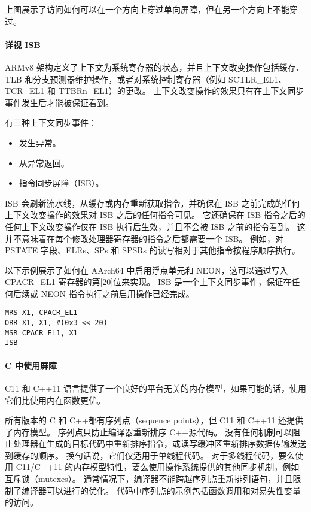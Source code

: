 
上图展示了访问如何可以在一个方向上穿过单向屏障，但在另一个方向上不能穿过。

\paragraph{详视 ISB}

ARMv8 架构定义了上下文为系统寄存器的状态，并且上下文改变操作包括缓存、TLB 和分支预测器维护操作，或者对系统控制寄存器（例如 SCTLR\_EL1、TCR\_EL1 和 TTBRn\_EL1）的更改。
上下文改变操作的效果只有在上下文同步事件发生后才能被保证看到。

有三种上下文同步事件：

\begin{itemize}
\item
  发生异常。
\item
  从异常返回。
\item
  指令同步屏障（ISB）。
\end{itemize}

ISB 会刷新流水线，从缓存或内存重新获取指令，并确保在 ISB 之前完成的任何上下文改变操作的效果对 ISB 之后的任何指令可见。
它还确保在 ISB 指令之后的任何上下文改变操作仅在 ISB 执行后生效，并且不会被 ISB 之前的指令看到。
这并不意味着在每个修改处理器寄存器的指令之后都需要一个 ISB。
例如，对 PSTATE 字段、ELRs、SPs 和 SPSRs 的读写相对于其他指令按程序顺序执行。

以下示例展示了如何在 AArch64 中启用浮点单元和 NEON，这可以通过写入 CPACR\_EL1 寄存器的第{[}20{]}位来实现。
ISB 是一个上下文同步事件，保证在任何后续或 NEON 指令执行之前启用操作已经完成。

\begin{lstlisting}
MRS X1, CPACR_EL1
ORR X1, X1, #(0x3 << 20)
MSR CPACR_EL1, X1
ISB
\end{lstlisting}

\paragraph{C 中使用屏障}

C11 和 C++11 语言提供了一个良好的平台无关的内存模型，如果可能的话，使用它们比使用内在函数更优。

所有版本的 C 和 C++都有序列点（sequence points），但 C11 和 C++11 还提供了内存模型。
序列点只防止编译器重新排序 C++源代码。
没有任何机制可以阻止处理器在生成的目标代码中重新排序指令，或读写缓冲区重新排序数据传输发送到缓存的顺序。
换句话说，它们仅适用于单线程代码。
对于多线程代码，要么使用 C11/C++11 的内存模型特性，要么使用操作系统提供的其他同步机制，例如互斥锁（mutexes）。
通常情况下，编译器不能跨越序列点重新排列语句，并且限制了编译器可以进行的优化。
代码中序列点的示例包括函数调用和对易失性变量的访问。

